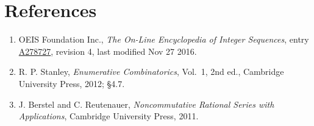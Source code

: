 \documentclass[11pt]{article}
\theoremstyle{definition}
\begin{document}
\section{References}

\begin{enumerate}

\item OEIS Foundation Inc., \emph{The On-Line Encyclopedia of Integer Sequences}, entry \href{https://oeis.org/A278727}{A278727}, revision 4, last modified Nov 27 2016.

\item R. P. Stanley, \emph{Enumerative Combinatorics}, Vol.~1, 2nd ed., Cambridge University Press, 2012; \S4.7.

\item J. Berstel and C. Reutenauer, \emph{Noncommutative Rational Series with Applications}, Cambridge University Press, 2011.

\end{enumerate}
\end{document}
